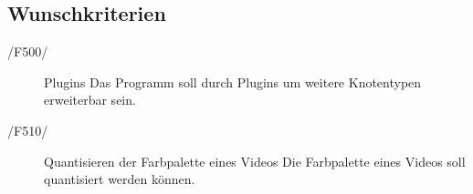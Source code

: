 \subsection{Wunschkriterien}
	\begin{description}
		\item[/F500/]Plugins \newline
			Das Programm soll durch Plugins um weitere Knotentypen erweiterbar sein.
		\item[/F510/]Quantisieren der Farbpalette eines Videos \newline
			Die Farbpalette eines Videos soll quantisiert werden können.
	\end{description}

 

